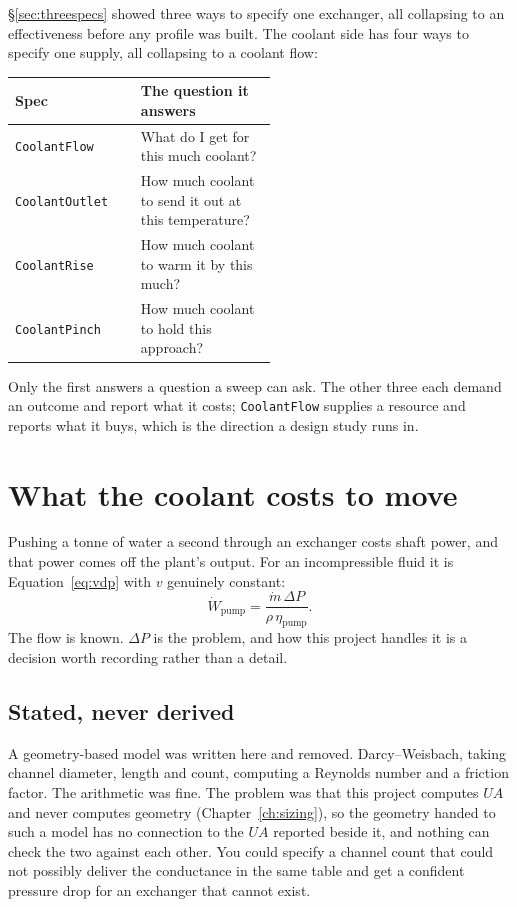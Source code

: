 \documentclass[11pt,a4paper]{report}
\newcommand{\code}[1]{\texttt{\small #1}}
\begin{document}
\S\ref{sec:threespecs} showed three ways to specify one exchanger, all
collapsing to an effectiveness before any profile was built. The coolant
side has four ways to specify one supply, all collapsing to a coolant flow:


\begin{center}
\begin{tabular}{@{}lp{0.52\linewidth}@{}}
\toprule
Spec & The question it answers \\
\midrule
\code{CoolantFlow}    & What do I get for this much coolant? \\
\code{CoolantOutlet}  & How much coolant to send it out at this temperature? \\
\code{CoolantRise}    & How much coolant to warm it by this much? \\
\code{CoolantPinch}   & How much coolant to hold this approach? \\
\bottomrule
\end{tabular}
\end{center}

Only the first answers a question a sweep can ask. The other three each
demand an outcome and report what it costs; \code{CoolantFlow} supplies a
resource and reports what it buys, which is the direction a design study
runs in.


\section{What the coolant costs to move}
\label{sec:pumping}

Pushing a tonne of water a second through an exchanger costs shaft power,
and that power comes off the plant's output. For an incompressible fluid it
is Equation~\eqref{eq:vdp} with $v$ genuinely constant:
\[
  \dot W_{\text{pump}} = \frac{\dot m\, \Delta P}{\rho\, \eta_{\text{pump}}}.
\]
The flow is known. $\Delta P$ is the problem, and how this project handles
it is a decision worth recording rather than a detail.

\subsection{Stated, never derived}

A geometry-based model was written here and removed. Darcy--Weisbach, taking
channel diameter, length and count, computing a Reynolds number and a
friction factor. The arithmetic was fine. The problem was that this project
computes $UA$ and never computes geometry (Chapter~\ref{ch:sizing}), so the
geometry handed to such a model has no connection to the $UA$ reported
beside it, and nothing can check the two against each other. You could
specify a channel count that could not possibly deliver the conductance in
the same table and get a confident pressure drop for an exchanger that
cannot exist.
\end{document}
